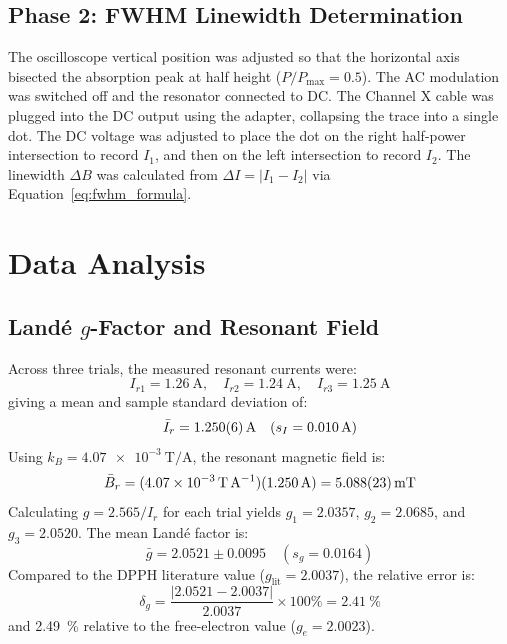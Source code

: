 \documentclass[journal]{IEEEtran}
\begin{document}
\subsection{Phase 2: FWHM Linewidth Determination}
The oscilloscope vertical position was adjusted so that the horizontal axis bisected the absorption peak at half height ($P/P_{\max} = 0.5$). The AC modulation was switched off and the resonator connected to DC. The Channel X cable was plugged into the DC output using the adapter, collapsing the trace into a single dot. The DC voltage was adjusted to place the dot on the right half-power intersection to record $I_1$, and then on the left intersection to record $I_2$. The linewidth $\Delta B$ was calculated from $\Delta I = |I_1 - I_2|$ via Equation~\eqref{eq:fwhm_formula}.

\section{Data Analysis}

\subsection{Land\'e \texorpdfstring{$g$}{g}-Factor and Resonant Field}
Across three trials, the measured resonant currents were:
\begin{equation}
    I_{r1} = \SI{1.26}{\ampere}, \quad I_{r2} = \SI{1.24}{\ampere}, \quad I_{r3} = \SI{1.25}{\ampere}
\end{equation}
giving a mean and sample standard deviation of:
\begin{equation}
    \bar{I}_r = \SI{1.250 \pm 0.006}{\ampere} \quad (s_I = \SI{0.010}{\ampere})
\end{equation}
Using $k_B = \SI{4.07e-3}{\tesla\per\ampere}$, the resonant magnetic field is:
\begin{equation}
    \bar{B}_r = (\SI{4.07e-3}{\tesla\per\ampere}) (\SI{1.250}{\ampere}) = \SI{5.088 \pm 0.023}{\milli\tesla}
\end{equation}
Calculating $g = 2.565 / I_r$ for each trial yields $g_1 = 2.0357$, $g_2 = 2.0685$, and $g_3 = 2.0520$. The mean Land\'e factor is:
\begin{equation}
    \bar{g} = 2.0521 \pm 0.0095 \quad (s_g = 0.0164)
\end{equation}
Compared to the DPPH literature value ($g_{\text{lit}} = 2.0037$), the relative error is:
\begin{equation}
    \delta_g = \frac{|2.0521 - 2.0037|}{2.0037} \times 100\% = \SI{2.41}{\percent}
\end{equation}
and \SI{2.49}{\percent} relative to the free-electron value ($g_e = 2.0023$).
\end{document}
